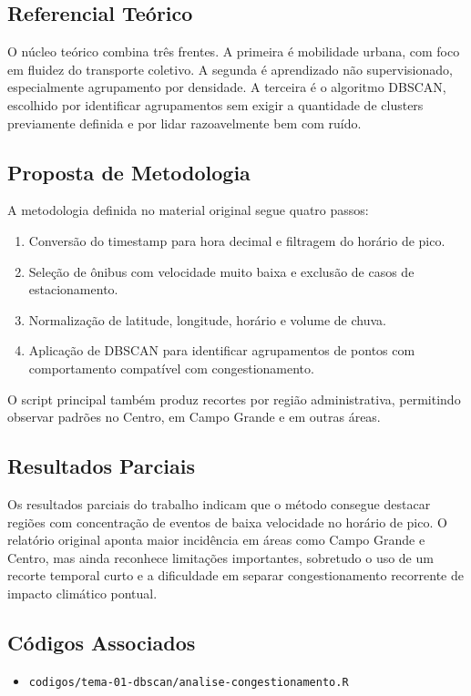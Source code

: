 \documentclass[runningheads]{llncs}
\begin{document}
\subsection{Referencial Teórico}
O núcleo teórico combina três frentes. A primeira é mobilidade urbana, com foco em fluidez do transporte coletivo. A segunda é aprendizado não supervisionado, especialmente agrupamento por densidade. A terceira é o algoritmo DBSCAN, escolhido por identificar agrupamentos sem exigir a quantidade de clusters previamente definida e por lidar razoavelmente bem com ruído.

\subsection{Proposta de Metodologia}
A metodologia definida no material original segue quatro passos:
\begin{enumerate}[leftmargin=*]
\item Conversão do timestamp para hora decimal e filtragem do horário de pico.
\item Seleção de ônibus com velocidade muito baixa e exclusão de casos de estacionamento.
\item Normalização de latitude, longitude, horário e volume de chuva.
\item Aplicação de DBSCAN para identificar agrupamentos de pontos com comportamento compatível com congestionamento.
\end{enumerate}

O script principal também produz recortes por região administrativa, permitindo observar padrões no Centro, em Campo Grande e em outras áreas.

\subsection{Resultados Parciais}
Os resultados parciais do trabalho indicam que o método consegue destacar regiões com concentração de eventos de baixa velocidade no horário de pico. O relatório original aponta maior incidência em áreas como Campo Grande e Centro, mas ainda reconhece limitações importantes, sobretudo o uso de um recorte temporal curto e a dificuldade em separar congestionamento recorrente de impacto climático pontual.

\subsection{Códigos Associados}
\begin{itemize}[leftmargin=*]
\item \texttt{codigos/tema-01-dbscan/analise-congestionamento.R}
\end{itemize}
\end{document}
